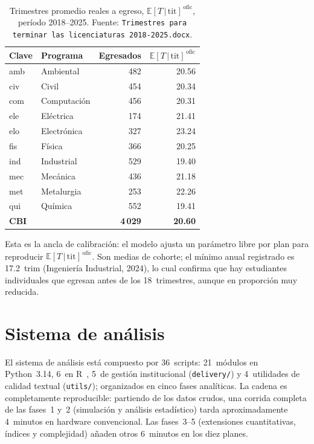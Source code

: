 \documentclass[11pt,letterpaper]{article}
\newcommand{\ETtit}{\mathbb{E}[T\,|\,\mathrm{tit}]}
\begin{document}
\begin{table}[H]\centering
\caption{Trimestres promedio reales a egreso, $\ETtit^{\,\mathrm{ofic}}$,
         período 2018--2025.
         Fuente: \texttt{Trimestres para terminar las licenciaturas 2018-2025.docx}.}
\label{tab:et_oficial}
\small
\begin{tabular}{llrr}
\toprule
Clave & Programa & Egresados & $\ETtit^{\,\mathrm{ofic}}$ \\
\midrule
amb & Ambiental    & 482 & 20.56 \\
civ & Civil        & 454 & 20.34 \\
com & Computación  & 456 & 20.31 \\
ele & Eléctrica    & 174 & 21.41 \\
elo & Electrónica  & 327 & 23.24 \\
fis & Física       & 366 & 20.25 \\
ind & Industrial   & 529 & 19.40 \\
mec & Mecánica     & 436 & 21.18 \\
met & Metalurgia   & 253 & 22.26 \\
qui & Química      & 552 & 19.41 \\
\midrule
\textbf{CBI} & & \textbf{4\,029} & \textbf{20.60} \\
\bottomrule
\end{tabular}
\end{table}

Esta es la ancla de calibración: el modelo ajusta un parámetro libre por plan
para reproducir $\ETtit^{\,\mathrm{ofic}}$.
Son medias de cohorte; el mínimo anual registrado es 17.2~trim
(Ingeniería Industrial, 2024), lo cual confirma que hay estudiantes
individuales que egresan antes de los 18~trimestres, aunque en proporción
muy reducida.

\section{Sistema de análisis}
\label{sec:sistema}

El sistema de análisis está compuesto por 36~scripts: 21~módulos en
Python~3.14, 6~en R~\cite{RCoreTeam2024}, 5~de gestión institucional
(\texttt{delivery/}) y 4~utilidades de calidad textual (\texttt{utils/});
organizados en cinco fases analíticas.
La cadena es completamente reproducible: partiendo de los datos crudos,
una corrida completa de las fases~1 y~2 (simulación y análisis estadístico)
tarda aproximadamente 4~minutos en hardware convencional.
Las fases~3--5 (extensiones cuantitativas, índices y complejidad) añaden
otros 6~minutos en los diez planes.
\end{document}
